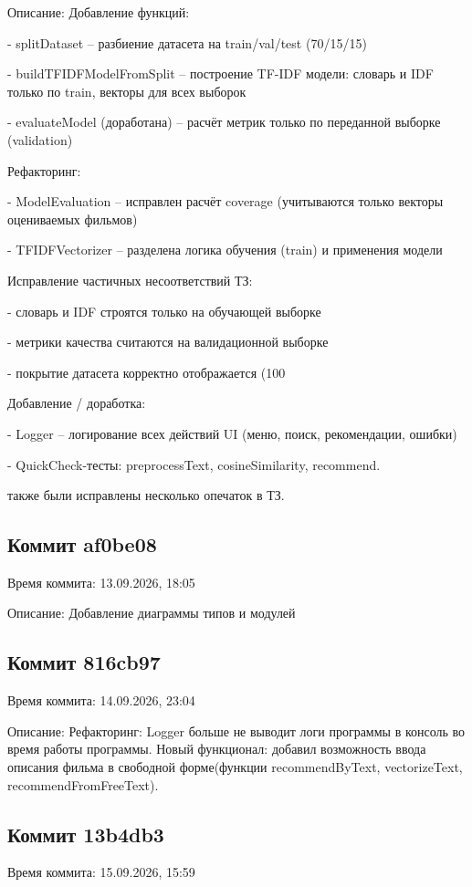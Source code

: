 \documentclass[a4paper, 16pt]{article}
\begin{document}
Описание: Добавление функций:

    - splitDataset – разбиение датасета на train/val/test (70/15/15)
    
    - buildTFIDFModelFromSplit – построение TF-IDF модели: словарь и IDF только по train, векторы для всех выборок
    
    - evaluateModel (доработана) – расчёт метрик только по переданной выборке (validation)
    
    Рефакторинг:
    
    - ModelEvaluation – исправлен расчёт coverage (учитываются только векторы оцениваемых фильмов)
    
    - TFIDFVectorizer – разделена логика обучения (train) и применения модели
    
    Исправление частичных несоответствий ТЗ:
    
    - словарь и IDF строятся только на обучающей выборке
    
    - метрики качества считаются на валидационной выборке
    
    - покрытие датасета корректно отображается (100%
    
    Добавление / доработка:
    
    - Logger – логирование всех действий UI (меню, поиск, 
    рекомендации, ошибки)
    
    - QuickCheck-тесты: preprocessText, cosineSimilarity, recommend.
    
    также были исправлены несколько опечаток в ТЗ.



\subsection*{Коммит af0be08}
Время коммита: 13.09.2026, 18:05

Описание: Добавление диаграммы типов и модулей

\subsection*{Коммит 816cb97}
Время коммита: 14.09.2026, 23:04

Описание: Рефакторинг: Logger больше не выводит логи программы в консоль во время работы программы. Новый функционал: добавил возможность ввода описания фильма в свободной форме(функции recommendByText, vectorizeText, recommendFromFreeText).

\subsection*{Коммит 13b4db3}
Время коммита: 15.09.2026, 15:59
\end{document}
